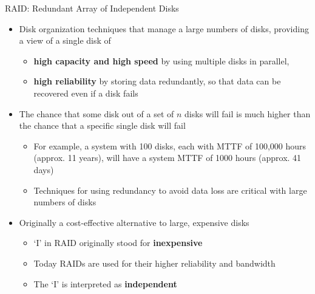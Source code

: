 \documentclass[aspectratio=169, xcolor=dvipsnames]{beamer}
\begin{document}
\begin{frame}{RAID: Redundant Array of Independent Disks}
    \begin{itemize}[<+->]
        \item Disk organization techniques that manage a large numbers of disks, providing a view of a single disk of
        \begin{itemize}
            \item[$\triangleright$] \textbf{high capacity and high speed} by using multiple disks in parallel,
            \item[$\triangleright$] \textbf{high reliability} by storing data redundantly, so that data can be recovered even if a disk fails
        \end{itemize}
        \item The chance that some disk out of a set of $n$ disks will fail is much higher than the chance that a specific single disk will fail
        \begin{itemize}
            \item[$\triangleright$] For example, a system with 100 disks, each with MTTF of 100,000 hours (approx. 11 years), will have a system MTTF of 1000 hours (approx. 41 days)
            \item[$\triangleright$] Techniques for using redundancy to avoid data loss are critical with large numbers of disks
        \end{itemize}
        \item Originally a cost-effective alternative to large, expensive disks
        \begin{itemize}
            \item[$\triangleright$] `I' in RAID originally stood for \textbf{inexpensive}
            \item[$\triangleright$] Today RAIDs are used for their higher reliability and bandwidth
            \item[$\triangleright$] The `I' is interpreted as \textbf{independent}
        \end{itemize}
    \end{itemize}
\end{frame}
\end{document}
